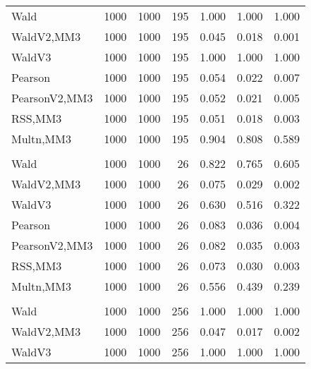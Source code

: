\documentclass[
]{article}
\begin{document}
\begin{table}[H]
{\begin{tabular}[t]{lrrrrrr}
\hspace{1em}Wald & 1000 & 1000 & 195 & 1.000 & 1.000 & 1.000\\
\hspace{1em}WaldV2,MM3 & 1000 & 1000 & 195 & 0.045 & 0.018 & 0.001\\
\hspace{1em}WaldV3 & 1000 & 1000 & 195 & 1.000 & 1.000 & 1.000\\
\hspace{1em}Pearson & 1000 & 1000 & 195 & 0.054 & 0.022 & 0.007\\
\hspace{1em}PearsonV2,MM3 & 1000 & 1000 & 195 & 0.052 & 0.021 & 0.005\\
\hspace{1em}RSS,MM3 & 1000 & 1000 & 195 & 0.051 & 0.018 & 0.003\\
\hspace{1em}Multn,MM3 & 1000 & 1000 & 195 & 0.904 & 0.808 & 0.589\\
\addlinespace[0.3em]
\multicolumn{7}{l}{\textbf{2F 10V}}\\
\hspace{1em}Wald & 1000 & 1000 & 26 & 0.822 & 0.765 & 0.605\\
\hspace{1em}WaldV2,MM3 & 1000 & 1000 & 26 & 0.075 & 0.029 & 0.002\\
\hspace{1em}WaldV3 & 1000 & 1000 & 26 & 0.630 & 0.516 & 0.322\\
\hspace{1em}Pearson & 1000 & 1000 & 26 & 0.083 & 0.036 & 0.004\\
\hspace{1em}PearsonV2,MM3 & 1000 & 1000 & 26 & 0.082 & 0.035 & 0.003\\
\hspace{1em}RSS,MM3 & 1000 & 1000 & 26 & 0.073 & 0.030 & 0.003\\
\hspace{1em}Multn,MM3 & 1000 & 1000 & 26 & 0.556 & 0.439 & 0.239\\
\addlinespace[0.3em]
\multicolumn{7}{l}{\textbf{3F 15V}}\\
\hspace{1em}Wald & 1000 & 1000 & 256 & 1.000 & 1.000 & 1.000\\
\hspace{1em}WaldV2,MM3 & 1000 & 1000 & 256 & 0.047 & 0.017 & 0.002\\
\hspace{1em}WaldV3 & 1000 & 1000 & 256 & 1.000 & 1.000 & 1.000\\

\end{tabular}}
\end{table}
\end{document}
